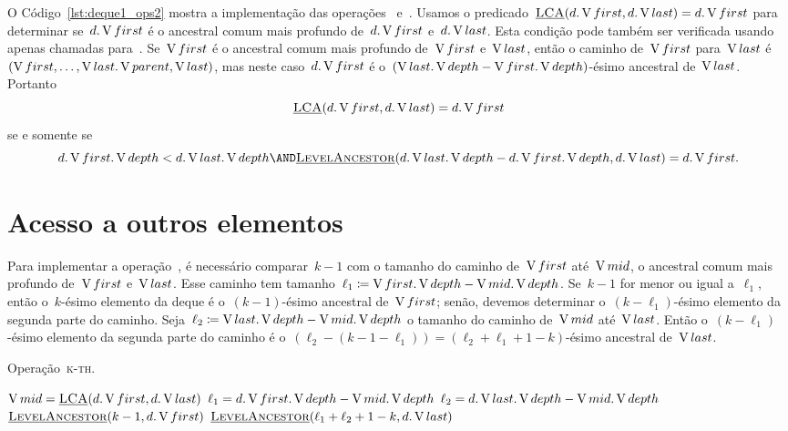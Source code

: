 \documentclass[../../main.tex]{subfiles}
\begin{document}
O Código~\ref{lst:deque1_ops2} mostra a implementação das operações~ e~. Usamos o predicado~${\mbox{\textsc{\underline{LCA}}\ensuremath{(d.\operatorname{V}{first}, d.\operatorname{V}{last})}} = d.\operatorname{V}{first}}$ para determinar se~$d.\operatorname{V}{first}$ é o ancestral comum mais profundo de~$d.\operatorname{V}{first}$ e~$d.\operatorname{V}{last}$. Esta condição pode também ser verificada usando apenas chamadas para~\mbox{}. Se~$\operatorname{V}{first}$ é o ancestral comum mais profundo de~$\operatorname{V}{first}$ e~$\operatorname{V}{last}$, então o caminho de~$\operatorname{V}{first}$ para~$\operatorname{V}{last}$ é~${(\operatorname{V}{first}, \ldots, \operatorname{V}{last}.\operatorname{V}{parent}, \operatorname{V}{last})}$, mas neste caso~$d.\operatorname{V}{first}$ é o~\mbox{${(\operatorname{V}{last}.\operatorname{V}{depth} - \operatorname{V}{first}.\operatorname{V}{depth})}$-ésimo} ancestral de~$\operatorname{V}{last}$. Portanto $$ \mbox{\textsc{\underline{LCA}}\ensuremath{(d.\operatorname{V}{first}, d.\operatorname{V}{last})}} = d.\operatorname{V}{first} $$ se e somente se $$ d.\V{first}.\V{depth} < d.\V{last}.\V{depth} \AND \funcAPI{LevelAncestor}{d.\V{last}.\V{depth} - d.\V{first}.\V{depth}, d.\V{last}} = d.\V{first}. $$

\section{Acesso a outros elementos}

Para implementar a operação~, é necessário comparar~$k-1$ com o tamanho do caminho de~$\operatorname{V}{first}$ até~$\operatorname{V}{mid}$, o ancestral comum mais profundo de~$\operatorname{V}{first}$ e~$\operatorname{V}{last}$. Esse caminho tem tamanho~${\ell_1 \coloneqq \operatorname{V}{first}.\operatorname{V}{depth} - \operatorname{V}{mid}.\operatorname{V}{depth}}$. Se~$k-1$ for menor ou igual a~$\ell_1$, então o~$k$-ésimo elemento da deque é o~$(k-1)$-ésimo ancestral de~$\operatorname{V}{first}$; senão, devemos determinar o~$(k-\ell_1)$-ésimo elemento da segunda parte do caminho. Seja~${\ell_2 \coloneqq \operatorname{V}{last}.\operatorname{V}{depth} - \operatorname{V}{mid}.\operatorname{V}{depth}}$ o tamanho do caminho de~$\operatorname{V}{mid}$ até~$\operatorname{V}{last}$. Então o~$(k-\ell_1)$-ésimo elemento da segunda parte do caminho é o~$(\ell_2 - (k-1-\ell_1)) = (\ell_2 + \ell_1 + 1 - k)$-ésimo ancestral de~$\operatorname{V}{last}$.

\begin{algorithm}
\caption{Operação~\textsc{k-th}.} \label{lst:deque1_ops3}
\begin{algorithmic}[1]

	\State $\operatorname{V}{mid} = \mbox{\textsc{\underline{LCA}}\ensuremath{(d.\operatorname{V}{first}, d.\operatorname{V}{last})}}$
	\State $\ell_1 = d.\operatorname{V}{first}.\operatorname{V}{depth} - \operatorname{V}{mid}.\operatorname{V}{depth}$
	\State $\ell_2 = d.\operatorname{V}{last}.\operatorname{V}{depth} - \operatorname{V}{mid}.\operatorname{V}{depth}$
		\State \Return $\mbox{\textsc{\underline{LevelAncestor}}\ensuremath{(k - 1, d.\operatorname{V}{first})}}$
	\Else
		\State \Return $\mbox{\textsc{\underline{LevelAncestor}}\ensuremath{(\ell_1 + \ell_2 + 1 - k, d.\operatorname{V}{last})}}$
	\EndIf
\EndFunction

\end{algorithmic}
\end{algorithm}
\end{document}
